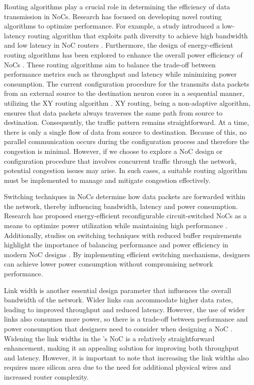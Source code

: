 Routing algorithms play a crucial role in determining the efficiency of data transmission in NoCs.
Research has focused on developing novel routing algorithms to optimize performance.
For example, a study introduced a low-latency routing algorithm that exploits path diversity to achieve high bandwidth and low latency in NoC routers \cite{yangExploitingPathDiversity2012}.
Furthermore, the design of energy-efficient routing algorithms has been explored to enhance the overall power efficiency of NoCs \cite{parikhPowerAwareNoCsRouting2014}.
These routing algorithms aim to balance the trade-off between performance metrics such as throughput and latency while minimizing power consumption.
The current configuration procedure for the \graicore{} transmits data packets from an external source to the destination neuron cores in a sequential manner, utilizing the XY routing algorithm \cite{glassTurnModelAdaptive1992}.
XY routing, being a non-adaptive algorithm, ensures that data packets always traverses the same path from source to destination.
Consequently, the traffic pattern remains straightforward.
At a time, there is only a single flow of data from source to destination.
Because of this, no parallel communication occurs during the configuration process and therefore the congestion is minimal.
However, if we choose to explore a NoC design or configuration procedure that involves concurrent traffic through the network, potential congestion issues may arise.
In such cases, a suitable routing algorithm must be implemented to manage and mitigate congestion effectively.

Switching techniques in NoCs determine how data packets are forwarded within the network, thereby influencing bandwidth, latency and power consumption.
Research has proposed energy-efficient reconfigurable circuit-switched NoCs as a means to optimize power utilization while maintaining high performance \cite{wolkotteEnergyEfficientReconfigurableCircuitSwitched2005}.
Additionally, studies on switching techniques with reduced buffer requirements highlight the importance of balancing performance and power efficiency in modern NoC designs \cite{requenaEfficientSwitchingTechnique2008}.
By implementing efficient switching mechanisms, designers can achieve lower power consumption without compromising network performance.

Link width is another essential design parameter that influences the overall bandwidth of the network.
Wider links can accommodate higher data rates, leading to improved throughput and reduced latency.
However, the use of wider links also consumes more power, so there is a trade-off between performance and power consumption that designers need to consider when designing a NoC \cite{manhokimNetworkonchipLinkAnalysis2006}.
Widening the link widths in the \graicore{}'s NoC is a relatively straightforward enhancement, making it an appealing solution for improving both throughput and latency.
However, it is important to note that increasing the link widths also requires more silicon area due to the need for additional physical wires and increased router complexity.

